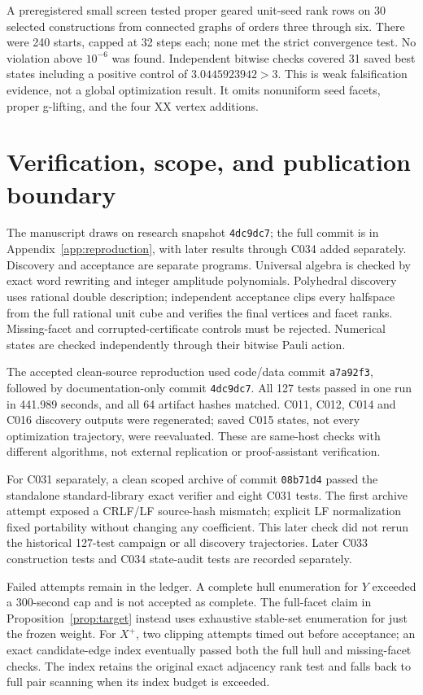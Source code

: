 \documentclass[11pt,a4paper]{article}
\theoremstyle{remark}\newtheorem{remark}[theorem]{Remark}
\begin{document}
A preregistered small screen tested proper geared unit-seed rank rows
on 30 selected constructions from connected graphs of orders three
through six. There were 240 starts, capped at 32 steps each; none met
the strict convergence test. No violation above $10^{-6}$ was found.
Independent bitwise checks covered 31 saved best states including a
positive control of $3.0445923942>3$. This is weak falsification evidence,
not a global optimization result. It omits nonuniform seed facets,
proper g-lifting, and the four XX vertex additions.

\section{Verification, scope, and publication boundary}\label{sec:verification}
The manuscript draws on research snapshot \texttt{4dc9dc7}; the full
commit is in Appendix~\ref{app:reproduction}, with later results through
C034 added separately. Discovery and acceptance
are separate programs. Universal algebra is checked by exact word
rewriting and integer amplitude polynomials. Polyhedral discovery uses
rational double description; independent acceptance clips every
halfspace from the full rational unit cube and verifies the final
vertices and facet ranks. Missing-facet and corrupted-certificate
controls must be rejected. Numerical states are checked independently
through their bitwise Pauli action.

The accepted clean-source reproduction used code/data commit
\texttt{a7a92f3}, followed by documentation-only commit
\texttt{4dc9dc7}. All 127 tests passed in one run in 441.989 seconds,
and all 64 artifact hashes matched. C011, C012, C014 and C016 discovery
outputs were regenerated; saved C015 states, not every optimization
trajectory, were reevaluated. These are same-host checks with different
algorithms, not external replication or proof-assistant verification.

For C031 separately, a clean scoped archive of commit \texttt{08b71d4}
passed the standalone standard-library exact verifier and eight C031
tests. The first archive attempt exposed a CRLF/LF source-hash mismatch;
explicit LF normalization fixed portability without changing any
coefficient. This later check did not rerun the historical 127-test
campaign or all discovery trajectories. Later C033 construction tests
and C034 state-audit tests are recorded separately.

Failed attempts remain in the ledger. A complete hull enumeration for
$Y$ exceeded a 300-second cap and is not accepted as complete. The
full-facet claim in Proposition~\ref{prop:target} instead uses exhaustive
stable-set enumeration for just the frozen weight. For $X^+$, two
clipping attempts timed out before acceptance; an exact candidate-edge
index eventually passed both the full hull and missing-facet checks.
The index retains the original exact adjacency rank test and falls back
to full pair scanning when its index budget is exceeded.
\end{document}
